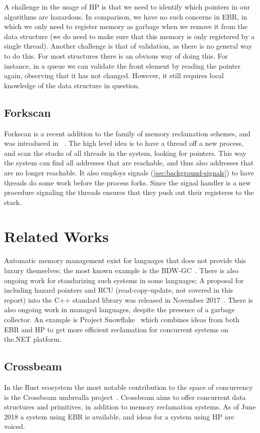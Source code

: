 A challenge in the usage of HP is that we need to identify which pointers in our algorithms are
hazardous. In comparison, we have no such concerns in EBR, in which we only need to register memory
as garbage when we remove it from the data structure (we do need to make sure that this memory is
only registered by a single thread). Another challenge is that of validation, as there is no
general way to do this. For most structures there is an obvious way of doing this. For instance, in
a queue we can validate the front element by reading the  pointer again, observing that
it has not changed. However, it still requires local knowledge of the data structure in question.


\subsection{Forkscan\label{sec:forkscan}}

Forkscan is a recent addition to the family of memory reclamation schemes, and was introduced in
~\cite{alistarh2017forkscan}. The high level idea is to have a thread  off a new
process, and scan the stacks of all threads in the system, looking for pointers. This way the
system can find all addresses that are reachable, and thus also addresses that are no longer
reachable. It also employs signals (\cref{sec:background-signals}) to have threads do some work
before the process forks. Since the signal handler is a new procedure signaling the threads ensures
that they push out their registeres to the stack.


\section{Related Works\label{sec:background-related}}

Automatic memory management exist for languages that does not provide this luxury themselves; the
most known example is the BDW-GC~\cite{bdwgc}.  There is also ongoing work for standarizing such
systems in some languages; A proposal for including hazard pointers and RCU (read-copy-update, not
covered in this report) into the C++ standard library was released in November 2017~\cite{cpp:mr}.
There is also ongoing work in managed languages, despite the presence of a garbage collector. An
example is Project
Snowflake~\cite{project-snowflake-non-blocking-safe-manual-memory-management-net} which combines
ideas from both EBR and HP to get more efficient reclamation for concurrent systems on the\@.NET
platform.


\subsection{Crossbeam}

In the Rust ecosystem the most notable contribution to the space of concurrency is the Crossbeam
umbrealla project~\cite{crossbeam}. Crossbeam aims to offer concurrent data structures and
primitives, in addition to memory reclamation systems. As of June 2018 a system using EBR is
available, and ideas for a system using HP are voiced.

